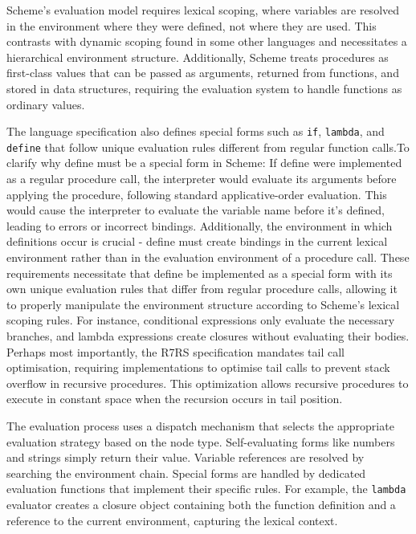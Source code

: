 \documentclass[final]{cmpreport_02}
\begin{document}
Scheme's evaluation model requires lexical scoping, where variables are resolved in the environment where they were defined, not where they are used. This contrasts with dynamic scoping found in some other languages and necessitates a hierarchical environment structure. Additionally, Scheme treats procedures as first-class values that can be passed as arguments, returned from functions, and stored in data structures, requiring the evaluation system to handle functions as ordinary values.

The language specification also defines special forms such as \texttt{if}, \texttt{lambda}, and \texttt{define} that follow unique evaluation rules different from regular function calls.To clarify why define must be a special form in Scheme: If define were implemented as a regular procedure call, the interpreter would evaluate its arguments before applying the procedure, following standard applicative-order evaluation. This would cause the interpreter to evaluate the variable name before it's defined, leading to errors or incorrect bindings. Additionally, the environment in which definitions occur is crucial - define must create bindings in the current lexical environment rather than in the evaluation environment of a procedure call. These requirements necessitate that define be implemented as a special form with its own unique evaluation rules that differ from regular procedure calls, allowing it to properly manipulate the environment structure according to Scheme's lexical scoping rules. For instance, conditional expressions only evaluate the necessary branches, and lambda expressions create closures without evaluating their bodies. Perhaps most importantly, the R7RS specification mandates tail call optimisation, requiring implementations to optimise tail calls to prevent stack overflow in recursive procedures. This optimization allows recursive procedures to execute in constant space when the recursion occurs in tail position.

The evaluation process uses a dispatch mechanism that selects the appropriate evaluation strategy based on the node type. Self-evaluating forms like numbers and strings simply return their value. Variable references are resolved by searching the environment chain. Special forms are handled by dedicated evaluation functions that implement their specific rules. For example, the \texttt{lambda} evaluator creates a closure object containing both the function definition and a reference to the current environment, capturing the lexical context.
\end{document}
